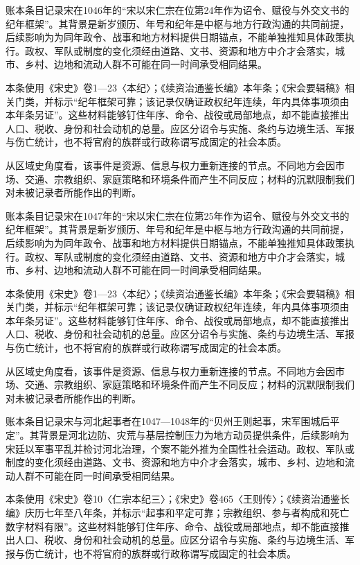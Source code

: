 账本条目记录宋在1046年的“宋以宋仁宗在位第24年作为诏令、赋役与外交文书的纪年框架”。其背景是新岁颁历、年号和纪年是中枢与地方行政沟通的共同前提，后续影响为为同年政令、战事和地方材料提供日期锚点，不能单独推知具体政策执行。政权、军队或制度的变化须经由道路、文书、资源和地方中介才会落实，城市、乡村、边地和流动人群不可能在同一时间承受相同结果。

本条使用《宋史》卷1—23〈本纪〉；《续资治通鉴长编》本年条；《宋会要辑稿》相关门类，并标示“纪年框架可靠；该记录仅确证政权纪年连续，年内具体事项须由本年条另证”。这些材料能够钉住年序、命令、战役或局部地点，却不能直接推出人口、税收、身份和社会动机的总量。应区分诏令与实施、条约与边境生活、军报与伤亡统计，也不将官府的族群或行政称谓写成固定的社会本质。

从区域史角度看，该事件是资源、信息与权力重新连接的节点。不同地方会因市场、交通、宗教组织、家庭策略和环境条件而产生不同反应；材料的沉默限制我们对未被记录者所能作出的判断。

账本条目记录宋在1047年的“宋以宋仁宗在位第25年作为诏令、赋役与外交文书的纪年框架”。其背景是新岁颁历、年号和纪年是中枢与地方行政沟通的共同前提，后续影响为为同年政令、战事和地方材料提供日期锚点，不能单独推知具体政策执行。政权、军队或制度的变化须经由道路、文书、资源和地方中介才会落实，城市、乡村、边地和流动人群不可能在同一时间承受相同结果。

本条使用《宋史》卷1—23〈本纪〉；《续资治通鉴长编》本年条；《宋会要辑稿》相关门类，并标示“纪年框架可靠；该记录仅确证政权纪年连续，年内具体事项须由本年条另证”。这些材料能够钉住年序、命令、战役或局部地点，却不能直接推出人口、税收、身份和社会动机的总量。应区分诏令与实施、条约与边境生活、军报与伤亡统计，也不将官府的族群或行政称谓写成固定的社会本质。

从区域史角度看，该事件是资源、信息与权力重新连接的节点。不同地方会因市场、交通、宗教组织、家庭策略和环境条件而产生不同反应；材料的沉默限制我们对未被记录者所能作出的判断。

账本条目记录宋与河北起事者在1047—1048年的“贝州王则起事，宋军围城后平定”。其背景是河北边防、灾荒与基层控制压力为地方动员提供条件，后续影响为宋廷以军事平乱并检讨河北治理，个案不能外推为全国性社会运动。政权、军队或制度的变化须经由道路、文书、资源和地方中介才会落实，城市、乡村、边地和流动人群不可能在同一时间承受相同结果。

本条使用《宋史》卷10〈仁宗本纪三〉；《宋史》卷465〈王则传〉；《续资治通鉴长编》庆历七年至八年条，并标示“起事和平定可靠；宗教组织、参与者构成和死亡数字材料有限”。这些材料能够钉住年序、命令、战役或局部地点，却不能直接推出人口、税收、身份和社会动机的总量。应区分诏令与实施、条约与边境生活、军报与伤亡统计，也不将官府的族群或行政称谓写成固定的社会本质。

